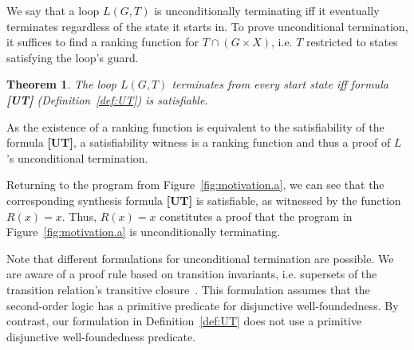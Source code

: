 \documentclass[preprint]{sigplanconf}
\newtheorem{theorem}{Theorem}
\theoremstyle{definition}
\begin{document}
We say that a loop $L(G, T)$ is unconditionally terminating iff it eventually
terminates regardless of the state it starts in. To prove unconditional termination, it suffices
to find a ranking function for \mbox{$T \cap (G \times X)$}, i.e. $T$ restricted to states satisfying the loop's guard.


\begin{theorem}
\label{thm:ut}
 The loop $L(G, T)$ terminates from every start state iff formula {\bf [UT]} (Definition~\ref{def:UT}) is satisfiable.
\end{theorem}

% 

As the existence of a ranking function is equivalent to the satisfiability
of the formula {\bf [UT]}, a satisfiability witness is a ranking
function and thus a proof of $L$'s unconditional termination.

Returning to the program from Figure~\ref{fig:motivation.a}, we
can see that the corresponding synthesis formula {\bf [UT]} is satisfiable,
as witnessed by the function $R(x) = x$.  Thus, $R(x) = x$ constitutes a
proof that the program in Figure~\ref{fig:motivation.a} is unconditionally
terminating.

Note that different formulations for unconditional termination are possible. 
We are aware of a proof rule based on transition invariants, i.e.  supersets
of the transition relation's transitive
closure~\cite{DBLP:conf/pldi/GrebenshchikovLPR12}.  This formulation assumes
that the second-order logic has a primitive predicate for disjunctive
well-foundedness.  By contrast, our formulation in Definition~\ref{def:UT}
does not use a primitive disjunctive well-foundedness predicate.  \\
\end{document}
